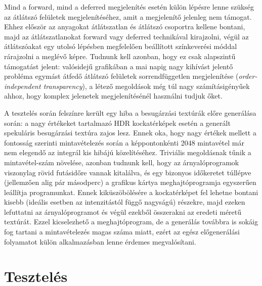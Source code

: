 Mind a forward, mind a deferred megjelenítés esetén külön lépésre lenne szükség az átlátszó felületek megjelenítéséhez, amit a megjelenítő jelenleg nem támogat. Ehhez először az anyagokat átlátszatlan és átlátszó csoportra kellene bontani, majd az átlátszatlanokat forward vagy deferred technikával kirajzolni, végül az átlátszóakat egy utolsó lépésben megfelelően beállított színkeverési móddal rárajzolni a meglévő képre. Tudnunk kell azonban, hogy ez csak alapszintű támogatást jelent: valósidejű grafikában a mai napig nagy kihívást jelentő probléma egymást átfedő átlátszó felületek sorrendfüggetlen megjelenítése (\textit{order-independent transparency}), a létező megoldások még túl nagy számításigényűek ahhoz, hogy komplex jelenetek megjelenítésénél használni tudjuk őket.

A tesztelés során felszínre került egy hiba a besugárzási textúrák előre generálása során: a nagy értékeket tartalmazó HDR kockatérképek esetén a generált spekuláris besugárzási textúra zajos lesz. Ennek oka, hogy nagy értékek mellett a fontosság szerinti mintavételezés során a képpontonkénti 2048 mintavétel már nem elegendő az integrál kis hibájú közelítéséhez. Triviális megoldásnak tűnik a mintavétel-szám növelése, azonban tudnunk kell, hogy az árnyalóprogramok viszonylag rövid futásidőre vannak kitalálva, és egy bizonyos időkeretet túllépve (jellemzően alig pár másodperc) a grafikus kártya meghajtóprogramja egyszerűen leállítja programunkat. Ennek kiküszöbölésére a kockatérképet fel lehetne bontani kisebb (ideális esetben az intenzitástól függő nagyságú) részekre, majd ezeken lefuttatni az árnyalóprogramot és végül ezekből összerakni az eredeti méretű textúrát. Ezzel kicselezhető a meghajtóprogram, de a generálás továbbra is sokáig fog tartani a mintavételezés magas száma miatt, ezért az egész előgenerálási folyamatot külön alkalmazásban lenne érdemes megvalósítani.

\section{Tesztelés}

